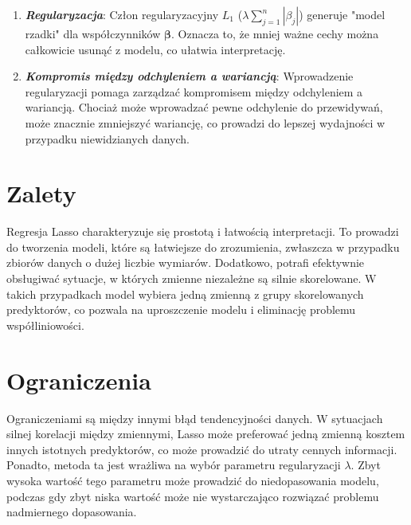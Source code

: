 \begin{enumerate}
    \item \textbf{\textit{Regularyzacja}}: Człon regularyzacyjny $L_1$ ($\lambda \sum_{j=1}^{n} |\beta_j|$) generuje "model rzadki" dla współczynników $\boldsymbol{ \beta }$. Oznacza to, że mniej ważne cechy można całkowicie usunąć z modelu, co ułatwia interpretację.
    
    \item \textbf{\textit{Kompromis między odchyleniem a wariancją}}: Wprowadzenie regularyzacji pomaga zarządzać kompromisem między odchyleniem a wariancją. Chociaż może wprowadzać pewne odchylenie do przewidywań, może znacznie zmniejszyć wariancję, co prowadzi do lepszej wydajności w przypadku niewidzianych danych.
\end{enumerate}

{}
\section*{Zalety}
\vspace{-1.0em}

\hspace{1.5cm} Regresja Lasso charakteryzuje się prostotą i łatwością interpretacji. To prowadzi do tworzenia modeli, które są łatwiejsze do zrozumienia, zwłaszcza w przypadku zbiorów danych o dużej liczbie wymiarów. Dodatkowo, potrafi efektywnie obsługiwać sytuacje, w których zmienne niezależne są silnie skorelowane. W takich przypadkach model wybiera jedną zmienną z grupy skorelowanych predyktorów, co pozwala na uproszczenie modelu i eliminację problemu współliniowości.

{}
\section*{Ograniczenia}
\vspace{-1.0em}

\hspace{1.5cm} Ograniczeniami są między innymi błąd tendencyjności danych. 
W sytuacjach silnej korelacji między zmiennymi, Lasso może preferować jedną zmienną kosztem innych istotnych predyktorów, co może prowadzić do utraty cennych informacji. 
Ponadto, metoda ta jest wrażliwa na wybór parametru regularyzacji $\lambda$. 
Zbyt wysoka wartość tego parametru może prowadzić do niedopasowania modelu, podczas gdy zbyt niska wartość może nie wystarczająco rozwiązać problemu nadmiernego dopasowania.

